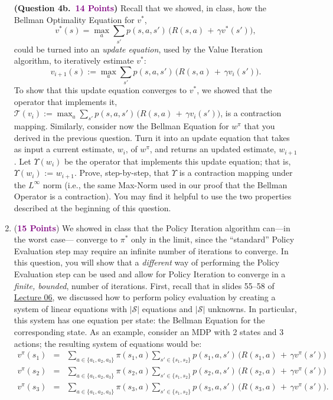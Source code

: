 \documentclass{article}
\newcommand{\POINTS}[1]{\textcolor{purple}{\textbf{{#1}}}}
\begin{document}
\begin{enumerate}
    
    \vspace{0.75cm}    
    \textbf{(Question 4b.~\POINTS{14 Points})} Recall that we showed, in class, how the Bellman Optimality Equation for $v^*$,
    $$v^*(s) = \max_a \sum_{s'} p(s,a,s') \, \big( R(s,a) \, + \, \gamma v^*(s') \big),$$
    could be turned into an \textit{update equation}, used by the Value Iteration algorithm, to iteratively estimate $v^*$:
    $$v_{i+1}(s) := \max_a \sum_{s'} p(s,a,s') \, \big( R(s,a) \, + \, \gamma v_{i}(s') \big).$$
    To show that this update equation converges to $v^*$, we showed that the operator that implements it, $\mathcal T(v_i) := \max_a \sum_{s'} p(s,a,s') \, \big( R(s,a) \, + \, \gamma v_{i}(s') \big)$, is a contraction mapping. 
    Similarly, consider now the Bellman Equation for $w^\pi$ that you derived in the previous question. Turn it into an update equation that takes as input a current estimate, $w_i$, of $w^\pi$, and returns an updated estimate, $w_{i+1}$. Let $\Upsilon(w_i)$ be the operator that implements this update equation; that is, $\Upsilon(w_i)$ := $w_{i+1}$. Prove, step-by-step, that $\Upsilon$ is a contraction mapping under the $L^\infty$ norm (i.e., the same Max-Norm used in our proof that the Bellman Operator is a contraction). You may find it helpful to use the two properties described at the beginning of this question.

    
    \newpage
    \item (\POINTS{15 Points}) We showed in class that the Policy Iteration algorithm can---in the worst case--- converge to $\pi^*$ only in the limit, since the ``standard'' Policy Evaluation step may require an infinite number of iterations to converge. In this question, you will show that a \textit{different} way of performing the Policy Evaluation step can be used and allow for Policy Iteration to converge in a \textit{finite, bounded}, number of iterations. First, recall that in slides 55--58 of \href{https://umass.moonami.com/pluginfile.php/2297824/mod_resource/content/4/06_CS687.pdf#page=55}{Lecture 06}, we discussed how to perform policy evaluation by creating a system of linear equations with $|\mathcal S|$ equations and $|\mathcal S|$ unknowns. In particular, this system has one equation per state: the Bellman Equation for the corresponding state. As an example, consider an MDP with 2 states and 3 actions; the resulting system of equations would be:
    \vspace{-0.05cm}
    \begin{eqnarray*}
    v^\pi(s_1) &=& \sum_{a \in \{a_1, a_2, a_3\}} \pi(s_1,a) \sum_{s' \in \{s_1, s_2\}} p(s_1,a,s') \, \big( R(s_1,a) \, + \, \gamma v^\pi(s') \big) \\
    v^\pi(s_2) &=& \sum_{a \in \{a_1, a_2, a_3\}} \pi(s_2,a) \sum_{s' \in \{s_1, s_2\}} p(s_2,a,s') \, \big( R(s_2,a) \, + \, \gamma v^\pi(s') \big) \\
    v^\pi(s_3) &=& \sum_{a \in \{a_1, a_2, a_3\}} \pi(s_3,a) \sum_{s' \in \{s_1, s_2\}} p(s_3,a,s') \, \big( R(s_3,a) \, + \, \gamma v^\pi(s') \big).    
    \end{eqnarray*}
    

\end{enumerate}
\end{document}
